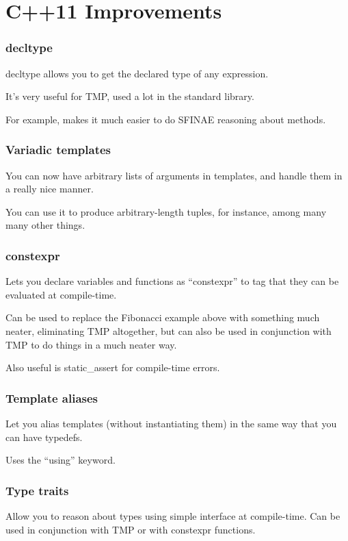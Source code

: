 \documentclass{beamer}
\begin{document}
  \section{C++11 Improvements}
  \begin{frame}
    \frametitle{decltype}
    \pause
    decltype allows you to get the declared type of any expression.

    \pause

    It's very useful for TMP, used a lot in the standard library.

    \pause

    For example, makes it much easier to do SFINAE reasoning about methods.
  \end{frame}
  \begin{frame}
    \frametitle{Variadic templates}
    \pause
    You can now have arbitrary lists of arguments in templates, and handle them
    in a really nice manner.

    \pause

    You can use it to produce arbitrary-length tuples, for instance, among many
    many other things.
  \end{frame}
  \begin{frame}
    \frametitle{constexpr}
    \pause
    Lets you declare variables and functions as ``constexpr'' to tag that they
    can be evaluated at compile-time.
    
    \pause
    
    Can be used to replace the Fibonacci example above with something much
    neater, eliminating TMP altogether, but can also be used in conjunction with
    TMP to do things in a much neater way.

    \pause

    Also useful is static\_assert for compile-time errors.
  \end{frame}
  \begin{frame}
    \frametitle{Template aliases}
    \pause
    Let you alias templates (without instantiating them) in the same way that
    you can have typedefs.
    
    \pause

    Uses the ``using'' keyword.
  \end{frame}
  \begin{frame}
    \frametitle{Type traits}
    \pause
    Allow you to reason about types using simple interface at compile-time. Can
    be used in conjunction with TMP or with constexpr functions.
  \end{frame}
\end{document}
